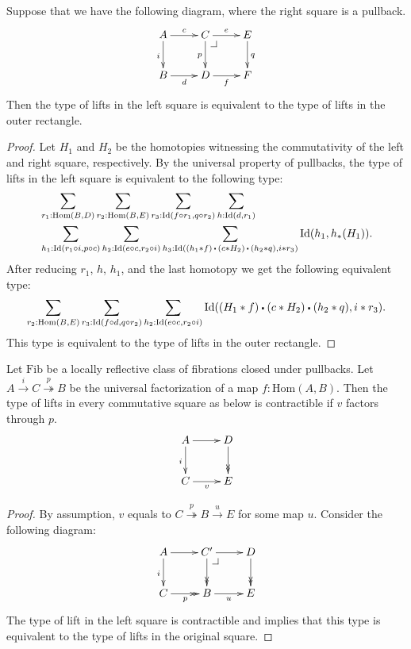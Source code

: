 \documentclass[reqno]{mscs}
\makeatletter
\newcommand{\fs}[1]{\mathrm{#1}}
\newcommand{\Hom}{\fs{Hom}}
\newcommand{\Id}{\fs{Id}}
\newcommand{\Fib}{\fs{Fib}}
\numberwithin{figure}{section}
\newcommand{\ct}{%
  \mathchoice{\mathbin{\raisebox{0.25ex}{$\displaystyle\centerdot$}}}%
             {\mathbin{\raisebox{0.25ex}{$\centerdot$}}}%
             {\mathbin{\raisebox{0.25ex}{$\scriptstyle\,\centerdot\,$}}}%
             {\mathbin{\raisebox{0.25ex}{$\scriptscriptstyle\,\centerdot\,$}}}
}
\newcommand{\pb}[1][dr]{\save*!/#1-1.2pc/#1:(-1,1)@^{|-}\restore}
\makeatother
\begin{document}
\begin{lem}
Suppose that we have the following diagram, where the right square is a pullback.
\[ \xymatrix{ A \ar[r]^{c} \ar[d]_i & C \ar[r]^e \ar[d]_p \pb   & E \ar[d]^q \\
              B \ar[r]_d            & D \ar[r]_f                & F
            } \]
Then the type of lifts in the left square is equivalent to the type of lifts in the outer rectangle.
\end{lem}
\begin{proof}
Let $H_1$ and $H_2$ be the homotopies witnessing the commutativity of the left and right square, respectively.
By the universal property of pullbacks, the type of lifts in the left square is equivalent to the following type:
\begin{align*}
& \sum_{r_1 : \Hom(B,D)} \sum_{r_2 : \Hom(B,E)} \sum_{r_3 : \Id(f \circ r_1, q \circ r_2)} \sum_{h : \Id(d,r_1)} \\
& \sum_{h_1 : \Id(r_1 \circ i, p \circ c)} \sum_{h_2 : \Id(e \circ c, r_2 \circ i)} \sum_{h_3 : \Id((h_1 * f) \ct (c * H_2) \ct (h_2 * q), i * r_3)} \Id(h_1,h_*(H_1)).
\end{align*}
After reducing $r_1$, $h$, $h_1$, and the last homotopy we get the following equivalent type:
\[ \sum_{r_2 : \Hom(B,E)} \sum_{r_3 : \Id(f \circ d, q \circ r_2)} \sum_{h_2 : \Id(e \circ c, r_2 \circ i)} \Id((H_1 * f) \ct (c * H_2) \ct (h_2 * q), i * r_3). \]
This type is equivalent to the type of lifts in the outer rectangle.
\end{proof}

\begin{lem}
Let $\Fib$ be a locally reflective class of fibrations closed under pullbacks.
Let $A \xrightarrow{i} C \overset{p}\twoheadrightarrow B$ be the universal factorization of a map $f : \Hom(A,B)$.
Then the type of lifts in every commutative square as below is contractible if $v$ factors through $p$.
\[ \xymatrix{ A \ar[r] \ar[d]_i & D \ar@{->>}[d] \\
              C \ar[r]_v        & E
            } \]
\end{lem}
\begin{proof}
By assumption, $v$ equals to $C \overset{p}\twoheadrightarrow B \xrightarrow{u} E$ for some map $u$.
Consider the following diagram:
\[ \xymatrix{ A \ar[r] \ar[d]_i & C' \ar[r] \ar@{->>}[d] \pb    & D \ar@{->>}[d] \\
              C \ar@{->>}[r]_p  & B \ar[r]_u                    & E
            } \]
The type of lift in the left square is contractible and  implies that this type is equivalent to the type of lifts in the original square.
\end{proof}
\end{document}

